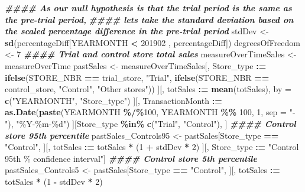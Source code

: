 \documentclass[
]{article}
\newenvironment{Shaded}{\begin{snugshade}}{\end{snugshade}}
\newcommand{\AttributeTok}[1]{\textcolor[rgb]{0.13,0.29,0.53}{#1}}
\newcommand{\DecValTok}[1]{\textcolor[rgb]{0.00,0.00,0.81}{#1}}
\newcommand{\DocumentationTok}[1]{\textcolor[rgb]{0.56,0.35,0.01}{\textbf{\textit{#1}}}}
\newcommand{\FunctionTok}[1]{\textcolor[rgb]{0.13,0.29,0.53}{\textbf{#1}}}
\newcommand{\NormalTok}[1]{#1}
\newcommand{\OtherTok}[1]{\textcolor[rgb]{0.56,0.35,0.01}{#1}}
\newcommand{\SpecialCharTok}[1]{\textcolor[rgb]{0.81,0.36,0.00}{\textbf{#1}}}
\newcommand{\StringTok}[1]{\textcolor[rgb]{0.31,0.60,0.02}{#1}}
\begin{document}
\begin{Shaded}
\begin{Highlighting}[]
\DocumentationTok{\#\#\#\# As our null hypothesis is that the trial period is the same as the pre{-}trial period, }
\DocumentationTok{\#\#\#\# let\textquotesingle{}s take the standard deviation based on the scaled percentage difference in the pre{-}trial period}
\NormalTok{stdDev }\OtherTok{\textless{}{-}} \FunctionTok{sd}\NormalTok{(percentageDiff[YEARMONTH }\SpecialCharTok{\textless{}} \DecValTok{201902}\NormalTok{ , percentageDiff])}
\NormalTok{degreesOfFreedom }\OtherTok{\textless{}{-}} \DecValTok{7}
\DocumentationTok{\#\#\#\# Trial and control store total sales}
\NormalTok{measureOverTimeSales }\OtherTok{\textless{}{-}}\NormalTok{ measureOverTime}
\NormalTok{pastSales }\OtherTok{\textless{}{-}}\NormalTok{ measureOverTimeSales[, Store\_type }\SpecialCharTok{:=} \FunctionTok{ifelse}\NormalTok{(STORE\_NBR }\SpecialCharTok{==}\NormalTok{ trial\_store, }\StringTok{"Trial"}\NormalTok{,}
\FunctionTok{ifelse}\NormalTok{(STORE\_NBR }\SpecialCharTok{==}\NormalTok{ control\_store, }\StringTok{"Control"}\NormalTok{, }\StringTok{"Other stores"}\NormalTok{))}
\NormalTok{][, totSales }\SpecialCharTok{:=} \FunctionTok{mean}\NormalTok{(totSales), by }\OtherTok{=} \FunctionTok{c}\NormalTok{(}\StringTok{"YEARMONTH"}\NormalTok{, }\StringTok{"Store\_type"}\NormalTok{)}
\NormalTok{][, TransactionMonth }\SpecialCharTok{:=} \FunctionTok{as.Date}\NormalTok{(}\FunctionTok{paste}\NormalTok{(YEARMONTH }\SpecialCharTok{\%/\%}\DecValTok{100}\NormalTok{, YEARMONTH }\SpecialCharTok{\%\%} \DecValTok{100}\NormalTok{, }\DecValTok{1}\NormalTok{, }\AttributeTok{sep =} \StringTok{"{-}"}\NormalTok{), }\StringTok{"\%Y{-}\%m{-}\%d"}\NormalTok{)}
\NormalTok{][Store\_type }\SpecialCharTok{\%in\%} \FunctionTok{c}\NormalTok{(}\StringTok{"Trial"}\NormalTok{, }\StringTok{"Control"}\NormalTok{), ]}
\DocumentationTok{\#\#\#\# Control store 95th percentile}
\NormalTok{pastSales\_Controls95 }\OtherTok{\textless{}{-}}\NormalTok{ pastSales[Store\_type }\SpecialCharTok{==} \StringTok{"Control"}\NormalTok{,}
\NormalTok{][, totSales }\SpecialCharTok{:=}\NormalTok{ totSales }\SpecialCharTok{*}\NormalTok{ (}\DecValTok{1} \SpecialCharTok{+}\NormalTok{ stdDev }\SpecialCharTok{*} \DecValTok{2}\NormalTok{)}
\NormalTok{][, Store\_type }\SpecialCharTok{:=} \StringTok{"Control 95th \% confidence interval"}\NormalTok{]}
\DocumentationTok{\#\#\#\# Control store 5th percentile}
\NormalTok{pastSales\_Controls5 }\OtherTok{\textless{}{-}}\NormalTok{ pastSales[Store\_type }\SpecialCharTok{==} \StringTok{"Control"}\NormalTok{,}
\NormalTok{][, totSales }\SpecialCharTok{:=}\NormalTok{ totSales }\SpecialCharTok{*}\NormalTok{ (}\DecValTok{1} \SpecialCharTok{{-}}\NormalTok{ stdDev }\SpecialCharTok{*} \DecValTok{2}\NormalTok{)}

\end{Highlighting}
\end{Shaded}
\end{document}
